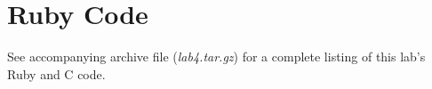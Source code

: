 \chapter{Ruby Code}\label{app:code}
See accompanying archive file (\emph{lab4.tar.gz}) for a complete listing of this lab's Ruby and C code.
